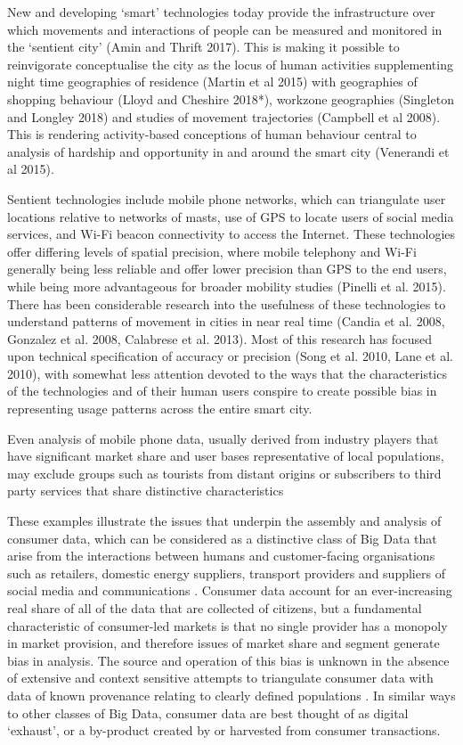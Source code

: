 New and developing ‘smart’ technologies today provide the infrastructure over
which movements and interactions of people can be measured and monitored in the
‘sentient city’ (Amin and Thrift 2017). This is making it possible to
reinvigorate conceptualise the city as the locus of human activities
supplementing night time geographies of residence (Martin et al 2015) with
geographies of shopping behaviour (Lloyd and Cheshire 2018*), workzone
geographies (Singleton and Longley 2018) and studies of movement trajectories
(Campbell et al 2008). This is rendering activity-based conceptions of human
behaviour central to analysis of hardship and opportunity in and around the
smart city (Venerandi et al 2015).

Sentient technologies include mobile phone networks, which can triangulate user
locations relative to networks of masts, use of GPS to locate users of social
media services, and Wi-Fi beacon connectivity to access the Internet. These
technologies offer differing levels of spatial precision, where mobile telephony
and Wi-Fi generally being less reliable and offer lower precision than GPS to
the end users, while being more advantageous for broader mobility studies
(Pinelli et al.  2015). There has been considerable research into the usefulness
of these technologies to understand patterns of movement in cities in near real
time (Candia et al. 2008, Gonzalez et al. 2008, Calabrese et al. 2013).  Most of
this research has focused upon technical specification of accuracy or precision
(Song et al. 2010, Lane et al. 2010), with somewhat less attention devoted to
the ways that the characteristics of the technologies and of their human users
conspire to create possible bias in representing usage patterns across the
entire smart city. 

Even analysis of mobile phone data, usually derived from industry players that
have significant market share and user bases representative of local
populations, may exclude groups such as tourists from distant origins or
subscribers to third party services that share distinctive characteristics
\citep{di2016mind}

These examples illustrate the issues that underpin the assembly and analysis of
consumer data, which can be considered as a distinctive class of Big Data that
arise from the interactions between humans and customer-facing organisations
such as retailers, domestic energy suppliers, transport providers and suppliers
of social media and communications \citep{cdrc2018consumer}.  Consumer data
account for an ever-increasing real share of all of the data that are collected
of citizens, but a fundamental characteristic of consumer-led markets is that no
single provider has a monopoly in market provision, and therefore issues of
market share and segment generate bias in analysis.  The source and operation of
this bias is unknown in the absence of extensive and context sensitive attempts
to triangulate consumer data with data of known provenance relating to clearly
defined populations \citep{lansley2016deriving}.  In similar ways to other
classes of Big Data, consumer data are best thought of as digital ‘exhaust’, or
a by-product created by or harvested from consumer transactions.

